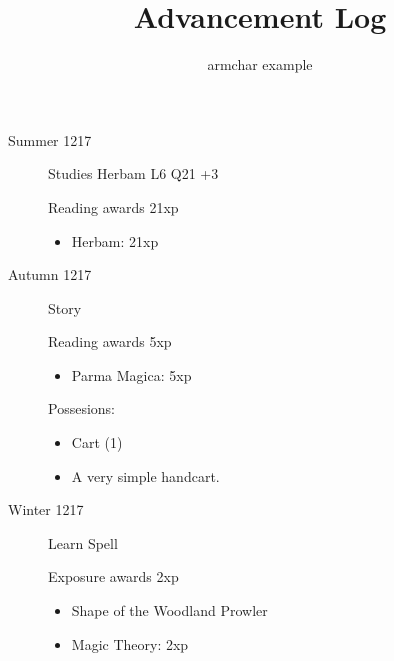 \documentclass{scrartcl}
\title{Advancement Log}
\author{armchar example}
\begin{document}
\maketitle
\begin{description}
  \item[Summer 1217]
    Studies Herbam L6 Q21 +3

    Reading awards 21xp
    \begin{itemize}
      \item Herbam: 21xp
    \end{itemize}
  \item[Autumn 1217]
    Story

    Reading awards 5xp
    \begin{itemize}
      \item Parma Magica: 5xp
    \end{itemize}
    Possesions:
    \begin{itemize}
      \item Cart (1)
      \item A very simple handcart.
    \end{itemize}
  \item[Winter 1217]
    Learn Spell

    Exposure awards 2xp
    \begin{itemize}
      \item Shape of the Woodland Prowler
      \item Magic Theory: 2xp
    \end{itemize}
\end{description}
\end{document}
